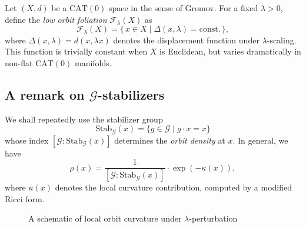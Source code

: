 \documentclass{amsart}
\begin{document}
Let %
$(X,d)$ be a $\mathrm{CAT}(0)$ space in %
the sense of Gromov. %
For a fixed $\lambda > 0$, define the \emph{low orbit foliation} $\mathcal{F}_\lambda(X)$ as
\begin{equation}\label{eq:foliation}
    \mathcal{F}_\lambda(X) = \{\,x \in X \mid \Delta(x, \lambda) = \text{const.}\,\},
\end{equation}
where $\Delta(x, \lambda) = d(x, \lambda x)$ denotes the displacement function under $\lambda$-scaling.  
This function is trivially constant when $X$ is Euclidean, but varies dramatically in non-flat $\mathrm{CAT}(0)$ %
manifolds.

\subsection{A remark on $\mathcal{G}$-stabilizers}
We %
shall repeatedly use the stabilizer %
group
\[
    \mathrm{Stab}_{\mathcal{G}}(x) = \{ g \in \mathcal{G} \mid g \cdot x = x \}
\]
whose %
index $[\mathcal{G} : \mathrm{Stab}_{\mathcal{G}}(x)]$ determines the \emph{orbit density} at $x$.  
In general, we have
\begin{equation}\label{eq:orbit-density}
    \rho(x) = \frac{1}{[\mathcal{G} : \mathrm{Stab}_{\mathcal{G}}(x)]} \cdot \exp(-\kappa(x)),
\end{equation}
where $\kappa(x)$ denotes the local curvature contribution, computed by a modified Ricci form.

\begin{figure}[htbp]
\centering
{}
\caption{A schematic of local orbit curvature under %
$\lambda$-perturbation%
}
\label{fig:curvature}
\end{figure}
\end{document}
